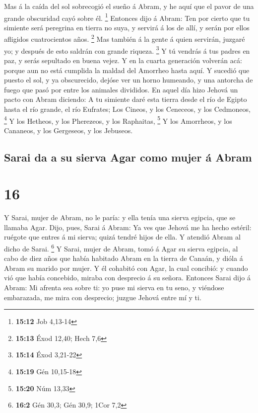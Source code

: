  Mas á la caída del sol sobrecogió el sueño á Abram, y he
aquí que el pavor de una grande obscuridad cayó sobre él. \footnote{\textbf{15:12}
  Job 4,13-14}  Entonces dijo á Abram: Ten por cierto que
tu simiente será peregrina en tierra no suya, y servirá á los de allí, y
serán por ellos afligidos cuatrocientos años. \footnote{\textbf{15:13}
  Éxod 12,40; Hech 7,6}  Mas también á la gente á quien
servirán, juzgaré yo; y después de esto saldrán con grande riqueza.
\footnote{\textbf{15:14} Éxod 3,21-22}  Y tú vendrás á
tus padres en paz, y serás sepultado en buena vejez.  Y
en la cuarta generación volverán acá: porque aun no está cumplida la
maldad del Amorrheo hasta aquí.  Y sucedió que puesto el
sol, y ya obscurecido, dejóse ver un horno humeando, y una antorcha de
fuego que pasó por entre los animales divididos.  En
aquel día hizo Jehová un pacto con Abram diciendo: A tu simiente daré
esta tierra desde el río de Egipto hasta el río grande, el río Eufrates;
 Los Cineos, y los Ceneceos, y los Cedmoneos, \footnote{\textbf{15:19}
  Gén 10,15-18}  Y los Hetheos, y los Pherezeos, y los
Raphaitas, \footnote{\textbf{15:20} Núm 13,33}  Y los
Amorrheos, y los Cananeos, y los Gergeseos, y los Jebuseos.

\hypertarget{sarai-da-a-su-sierva-agar-como-mujer-uxe1-abram}{%
\subsection{Sarai da a su sierva Agar como mujer á
Abram}\label{sarai-da-a-su-sierva-agar-como-mujer-uxe1-abram}}

\hypertarget{section-15}{%
\section{16}\label{section-15}}

 Y Sarai, mujer de Abram, no le paría: y ella tenía una
sierva egipcia, que se llamaba Agar.  Dijo, pues, Sarai á
Abram: Ya ves que Jehová me ha hecho estéril: ruégote que entres á mi
sierva; quizá tendré hijos de ella. Y atendió Abram al dicho de Sarai.
\footnote{\textbf{16:2} Gén 30,3; Gén 30,9; 1Cor 7,2}  Y
Sarai, mujer de Abram, tomó á Agar su sierva egipcia, al cabo de diez
años que había habitado Abram en la tierra de Canaán, y dióla á Abram su
marido por mujer.  Y él cohabitó con Agar, la cual
concibió: y cuando vió que había concebido, miraba con desprecio á su
señora.  Entonces Sarai dijo á Abram: Mi afrenta sea sobre
ti: yo puse mi sierva en tu seno, y viéndose embarazada, me mira con
desprecio; juzgue Jehová entre mí y ti.

